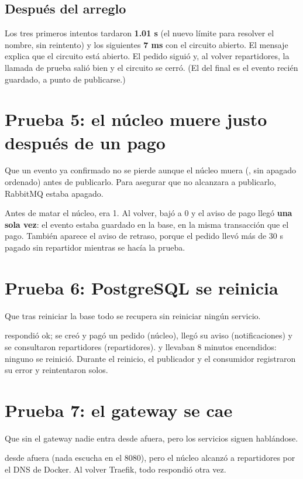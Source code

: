 \documentclass[11pt]{article}
\newcommand{\evidencia}[1]{}
\begin{document}
\subsection{Después del arreglo}
\evidencia{prueba-4.txt}
\observado Los tres primeros intentos tardaron \textbf{1.01 s} (el nuevo límite para resolver el nombre,
sin reintento) y los siguientes \textbf{7 ms} con el circuito abierto. El mensaje explica que el circuito
está abierto. El pedido siguió  y, al volver repartidores, la llamada de prueba salió bien y el
circuito se cerró. (El  del final es el evento  recién
guardado, a punto de publicarse.) \hfill\ok


\section{Prueba 5: el núcleo muere justo después de un pago}
\queria Que un evento ya confirmado no se pierde aunque el núcleo muera (, sin
apagado ordenado) antes de publicarlo. Para asegurar que no alcanzara a publicarlo, RabbitMQ estaba
apagado.
\evidencia{prueba-5.txt}
\observado Antes de matar el núcleo,  era 1. Al volver, bajó a 0 y el aviso de
pago llegó \textbf{una sola vez}: el evento estaba guardado en la base, en la misma transacción que el pago.
También aparece el aviso de retraso, porque el pedido llevó más de 30 s pagado sin repartidor mientras
se hacía la prueba. \hfill\ok

\section{Prueba 6: PostgreSQL se reinicia}
\queria Que tras reiniciar la base todo se recupera sin reiniciar ningún servicio.
\evidencia{prueba-6.txt}
\observado {} respondió ok; se creó y pagó un pedido (núcleo), llegó su aviso (notificaciones)
y se consultaron repartidores (repartidores).  y  llevaban 8 minutos
encendidos: ninguno se reinició. Durante el reinicio, el publicador y el consumidor registraron su error
y reintentaron solos. \hfill\ok

\section{Prueba 7: el gateway se cae}
\queria Que sin el gateway nadie entra desde afuera, pero los servicios siguen hablándose.
\evidencia{prueba-7.txt}
\observado {} desde afuera (nada escucha en el 8080), pero el núcleo alcanzó a repartidores por
el DNS de Docker. Al volver Traefik, todo respondió otra vez. \hfill\ok
\end{document}
